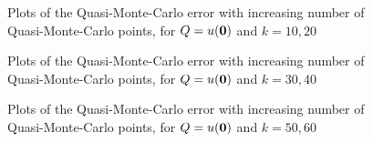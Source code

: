 \begin{figure}[h]
    \centering
  \begin{subfigure}{0.8\textwidth}

  \end{subfigure}
    \begin{subfigure}{0.8\textwidth}

    \end{subfigure}
\caption{Plots of the Quasi-Monte-Carlo error with increasing number of Quasi-Monte-Carlo points, for $Q=u(\mathbf{0})$ and $k=10,20$ \label{fig:qmcorigin1020}}
\end{figure}
\begin{figure}[h]
    \centering
  \begin{subfigure}{0.8\textwidth}

  \end{subfigure}
    \begin{subfigure}{0.8\textwidth}

    \end{subfigure}
\caption{Plots of the Quasi-Monte-Carlo error with increasing number of Quasi-Monte-Carlo points, for $Q=u(\mathbf{0})$ and $k=30,40$ \label{fig:qmcorigin3040}}
\end{figure}
\begin{figure}[h]
    \centering
  \begin{subfigure}{0.8\textwidth}

  \end{subfigure}
    \begin{subfigure}{0.8\textwidth}

    \end{subfigure}
\caption{Plots of the Quasi-Monte-Carlo error with increasing number of Quasi-Monte-Carlo points, for $Q=u(\mathbf{0})$ and $k=50,60$ \label{fig:qmcorigin5060}}
\end{figure}

